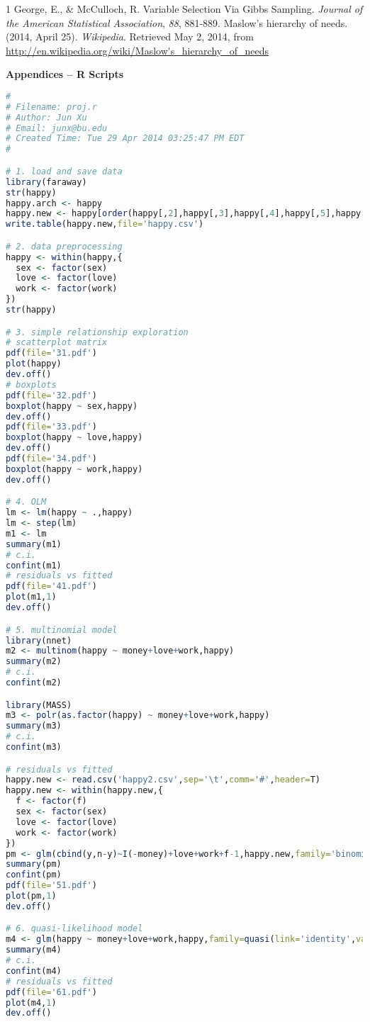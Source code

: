 \documentclass[11pt,letterpaper]{article}
\begin{document}
\begin{thebibliography}{1}
 George, E., \& McCulloch, R. Variable Selection Via Gibbs Sampling. \emph{Journal of the American Statistical Association}, \emph{88}, 881-889.
 Maslow's hierarchy of needs. (2014, April 25). \emph{Wikipedia}. Retrieved May 2, 2014, from \url{http://en.wikipedia.org/wiki/Maslow's\_hierarchy\_of\_needs}
\end{thebibliography}

\newpage
{\large\bf Appendices -- R Scripts}
\linespread{1}
\scriptsize{
\begin{lstlisting}[language=R]
#
# Filename: proj.r
# Author: Jun Xu
# Email: junx@bu.edu
# Created Time: Tue 29 Apr 2014 03:25:47 PM EDT
#

# 1. load and save data
library(faraway)
str(happy)
happy.arch <- happy
happy.new <- happy[order(happy[,2],happy[,3],happy[,4],happy[,5],happy[,1]),]
write.table(happy.new,file='happy.csv')

# 2. data preprocessing
happy <- within(happy,{
  sex <- factor(sex)
  love <- factor(love)
  work <- factor(work)
})
str(happy)

# 3. simple relationship exploration
# scatterplot matrix
pdf(file='31.pdf')
plot(happy)
dev.off()
# boxplots
pdf(file='32.pdf')
boxplot(happy ~ sex,happy)
dev.off()
pdf(file='33.pdf')
boxplot(happy ~ love,happy)
dev.off()
pdf(file='34.pdf')
boxplot(happy ~ work,happy)
dev.off()

# 4. OLM
lm <- lm(happy ~ .,happy)
lm <- step(lm)
m1 <- lm
summary(m1)
# c.i.
confint(m1)
# residuals vs fitted
pdf(file='41.pdf')
plot(m1,1)
dev.off()

# 5. multinomial model
library(nnet)
m2 <- multinom(happy ~ money+love+work,happy)
summary(m2)
# c.i.
confint(m2)

library(MASS)
m3 <- polr(as.factor(happy) ~ money+love+work,happy)
summary(m3)
# c.i.
confint(m3)

# residuals vs fitted
happy.new <- read.csv('happy2.csv',sep='\t',comm='#',header=T)
happy.new <- within(happy.new,{
  f <- factor(f)
  sex <- factor(sex)
  love <- factor(love)
  work <- factor(work)
})
pm <- glm(cbind(y,n-y)~I(-money)+love+work+f-1,happy.new,family='binomial')
summary(pm)
confint(pm)
pdf(file='51.pdf')
plot(pm,1)
dev.off()

# 6. quasi-likelihood model
m4 <- glm(happy ~ money+love+work,happy,family=quasi(link='identity',variance='constant'))
summary(m4)
# c.i.
confint(m4)
# residuals vs fitted
pdf(file='61.pdf')
plot(m4,1)
dev.off()


\end{lstlisting}}
\end{document}
